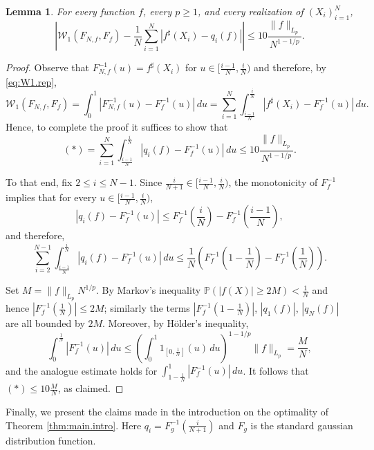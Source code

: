 \documentclass[11pt]{amsart}
\newcommand{\W}{\mathcal{W}}
\newtheorem{lemma}[theorem]{Lemma}
\theoremstyle{definition}
\renewcommand{\P}{\mathbb{P}}
\numberwithin{equation}{section}
\begin{document}
\begin{lemma}
\label{lem:quantile.shift}
	For every function $f$, every $p\geq 1$, and every realization of $(X_i)_{i=1}^N$,
	\[ \left| \W_1(F_{N,f} , F_f) - \frac{1}{N} \sum_{i=1}^N \left| f^\sharp(X_i) - q_i(f) \right| \right|
	\leq 10 \frac{ \|f\|_{L_p} }{ N^{1-1/p} }.\]
\end{lemma}
\begin{proof}
	Observe that $F_{N,f}^{-1}(u) = f^{\sharp}(X_{i}) $ for $u\in [\frac{i-1}{N}, \frac{i}{N})$ and therefore,  by \eqref{eq:W1.rep}, 
 	\[  \mathcal{W}_{1}(F_{N,f},F_{f})
	=   \int_{0}^{1}  \left| F_{N,f}^{-1}(u) - F_{f}^{-1}(u)\right|\,du
	=\sum_{i=1}^{N}   \int_{\frac{i-1}{N}}^{\frac{i}{N}}  \left| f^\sharp(X_i) - F_{f}^{-1}(u)\right|\,du.\]
	Hence, to complete the proof it suffices to show that
	\[ (\ast) = \sum_{i=1}^{N}   \int_{\frac{i-1}{N}}^{\frac{i}{N}}  \left|  q_i(f)  - F_{f}^{-1}(u)\right|\,du
	\leq 10 \frac{ \|f\|_{L_p} }{  N^{1-1/p}}.\]
	
	To that end, fix $2 \leq i \leq N-1$.
	Since $\frac{i}{N+1}\in [\frac{i-1}{N},\frac{i}{N})$, the monotonicity of $F_{f}^{-1}$  implies that for every $u\in [\frac{i-1}{N},\frac{i}{N})$,
	\[\left|  q_i(f)  - F_{f}^{-1}(u)\right|
	\leq F_{f}^{-1}\left(\frac{i}{N}\right) - F_{f}^{-1}\left(\frac{i-1}{N}\right) , \]
	and therefore, 
	\[  \sum_{i=2}^{N-1}   \int_{\frac{i-1}{N}}^{\frac{i}{N}}  \left|  q_i(f)  - F_{f}^{-1}(u)\right|\,du 
	\leq \frac{1}{N} \left( F_{f}^{-1}\left(1-\frac{1}{N}\right) - F_{f}^{-1}\left(\frac{1}{N}\right) \right).\]
	
	Set $M= \|f\|_{L_p} N^{1/p}$. 
	By  Markov's inequality  $\P( |f(X)| \geq 2M) < \frac{1}{N}$ and hence  $|F_{f}^{-1}(\frac{1}{N})|\leq 2M$;  similarly the terms $|F_{f}^{-1}(1-\frac{1}{N})|$, $|q_1(f)|$, $|q_N(f)|$ are all bounded by $2M$.
	Moreover, by H\"older's inequality, 
	\[ \int_{0}^{\frac{1}{N}}  |F_{f}^{-1}(u)|\,du
	\leq \left( \int_{0}^{1} 1_{[0,\frac{1}{N}]}(u)\,du\right)^{1-1/p} \|f\|_{L_p}
	=\frac{ M }{N},\]
	and the analogue estimate holds for  $\int_{1-\frac{1}{N}}^{1}  |F_{f}^{-1}(u)|\,du$.
	It follows  that  $(\ast) \leq 10\frac{M}{N}$, as claimed.
\end{proof}


Finally, we present the claims made in the introduction on the optimality of Theorem \ref{thm:main.intro}.
Here $q_i = F_g^{-1}(\frac{i}{N+1})$ and $F_g$ is the standard gaussian distribution function. 
\end{document}
